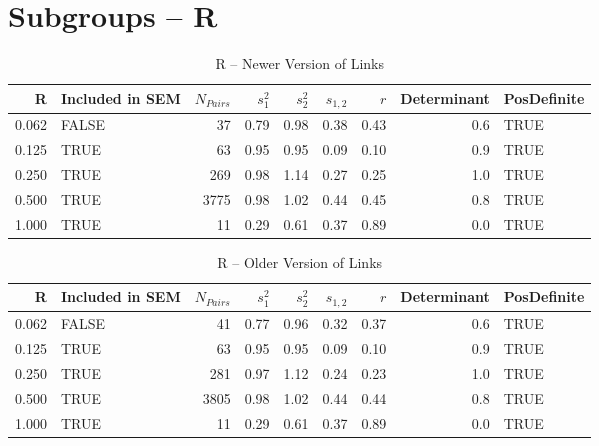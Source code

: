 \documentclass{article}\usepackage[]{graphicx}\usepackage[]{color}
\begin{document}
\section{Subgroups --  R }%
\begin{table}[ht]
\centering
\begin{tabular}{rlrrrrrrl}
  \hline
R & Included in SEM & $N_{Pairs}$ & $s_1^2$ & $s_2^2$ & $s_{1,2}$ & $r$ & Determinant & PosDefinite \\ 
  \hline
0.062 & FALSE & 37 & 0.79 & 0.98 & 0.38 & 0.43 & 0.6 & TRUE \\ 
  0.125 & TRUE & 63 & 0.95 & 0.95 & 0.09 & 0.10 & 0.9 & TRUE \\ 
  0.250 & TRUE & 269 & 0.98 & 1.14 & 0.27 & 0.25 & 1.0 & TRUE \\ 
  0.500 & TRUE & 3775 & 0.98 & 1.02 & 0.44 & 0.45 & 0.8 & TRUE \\ 
  1.000 & TRUE & 11 & 0.29 & 0.61 & 0.37 & 0.89 & 0.0 & TRUE \\ 
   \hline
\end{tabular}
\caption{R -- Newer Version of Links} 
\end{table}
\begin{table}[ht]
\centering
\begin{tabular}{rlrrrrrrl}
  \hline
R & Included in SEM & $N_{Pairs}$ & $s_1^2$ & $s_2^2$ & $s_{1,2}$ & $r$ & Determinant & PosDefinite \\ 
  \hline
0.062 & FALSE & 41 & 0.77 & 0.96 & 0.32 & 0.37 & 0.6 & TRUE \\ 
  0.125 & TRUE & 63 & 0.95 & 0.95 & 0.09 & 0.10 & 0.9 & TRUE \\ 
  0.250 & TRUE & 281 & 0.97 & 1.12 & 0.24 & 0.23 & 1.0 & TRUE \\ 
  0.500 & TRUE & 3805 & 0.98 & 1.02 & 0.44 & 0.44 & 0.8 & TRUE \\ 
  1.000 & TRUE & 11 & 0.29 & 0.61 & 0.37 & 0.89 & 0.0 & TRUE \\ 
   \hline
\end{tabular}
\caption{R -- Older Version of Links} 
\end{table}
\newpage 
\end{document}
